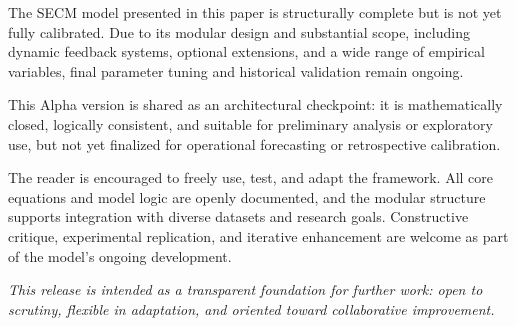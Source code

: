 \documentclass[12pt]{report}
\begin{document}
The SECM model presented in this paper is structurally complete but is not yet fully calibrated. Due to its modular design and substantial scope, including dynamic feedback systems, optional extensions, and a wide range of empirical variables, final parameter tuning and historical validation remain ongoing.

This Alpha version is shared as an architectural checkpoint: it is mathematically closed, logically consistent, and suitable for preliminary analysis or exploratory use, but not yet finalized for operational forecasting or retrospective calibration.

The reader is encouraged to freely use, test, and adapt the framework. All core equations and model logic are openly documented, and the modular structure supports integration with diverse datasets and research goals. Constructive critique, experimental replication, and iterative enhancement are welcome as part of the model's ongoing development.

\textit{This release is intended as a transparent foundation for further work: open to scrutiny, flexible in adaptation, and oriented toward collaborative improvement.}
\end{document}
